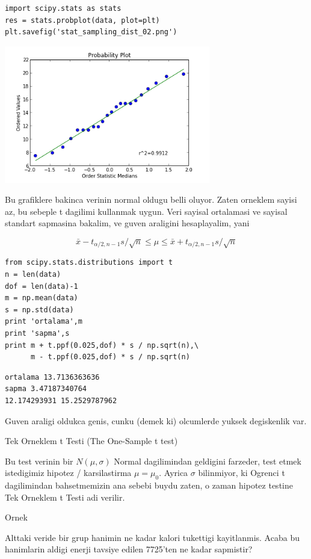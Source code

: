 \documentclass[12pt,fleqn]{article}\usepackage{../common}
\begin{document}
\begin{verbatim}
import scipy.stats as stats
res = stats.probplot(data, plot=plt)
plt.savefig('stat_sampling_dist_02.png')
\end{verbatim}

\includegraphics[height=6cm]{stat_sampling_dist_02.png}

Bu grafiklere bakinca verinin normal oldugu belli oluyor. Zaten orneklem
sayisi az, bu sebeple t dagilimi kullanmak uygun. Veri sayisal ortalamasi
ve sayisal standart sapmasina bakalim, ve guven araligini hesaplayalim, 
yani

$$ \bar{x} - t_{\alpha/2,n-1}s/\sqrt{n} \le
\mu \le
 \bar{x} + t_{\alpha/2,n-1}s/\sqrt{n}
$$

\begin{verbatim}
from scipy.stats.distributions import t
n = len(data)
dof = len(data)-1
m = np.mean(data)
s = np.std(data)
print 'ortalama',m
print 'sapma',s
print m + t.ppf(0.025,dof) * s / np.sqrt(n),\
      m - t.ppf(0.025,dof) * s / np.sqrt(n)
\end{verbatim}

\begin{verbatim}
ortalama 13.7136363636
sapma 3.47187340764
12.174293931 15.2529787962
\end{verbatim}

Guven araligi oldukca genis, cunku (demek ki) olcumlerde yuksek degiskenlik
var. 

Tek Orneklem t Testi (The One-Sample t test)

Bu test verinin bir $N(\mu,\sigma)$ Normal dagilimindan geldigini farzeder,
test etmek istedigimiz hipotez / karsilastirma $\mu = \mu_0$. Ayrica
$\sigma$ bilinmiyor, ki Ogrenci t dagilimindan bahsetmemizin ana sebebi
buydu zaten, o zaman hipotez testine Tek Orneklem t Testi adi verilir.

Ornek

Alttaki veride bir grup hanimin ne kadar kalori tukettigi
kayitlanmis. Acaba bu hanimlarin aldigi enerji tavsiye edilen 7725'ten ne
kadar sapmistir?
\end{document}
